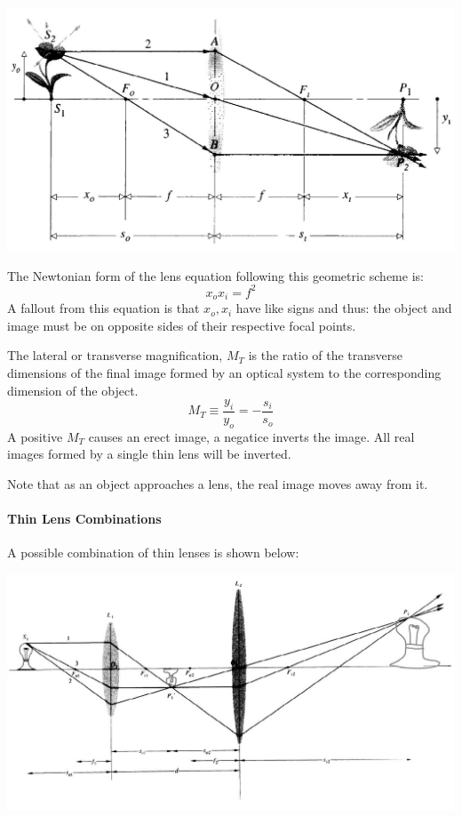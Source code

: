 \documentclass[12pt]{report}
\begin{document}
\includegraphics[scale=.4]{FiniteImagery.jpg}

The Newtonian form of the lens equation following this geometric scheme is: 
\begin{equation}
x_ox_i = f^2
\end{equation}
A fallout from this equation is that $x_o, x_i$ have like signs and thus: the object and image must be on opposite sides of their respective focal points. 

The lateral or transverse magnification, $M_T$ is the ratio of the transverse dimensions of the final image formed by an optical system to the corresponding dimension of the object. 
\begin{equation}
M_T \equiv \frac{y_i}{y_o} = -\frac{s_i}{s_o}
\end{equation}
A positive $M_T$ causes an erect image, a negatice inverts the image. All real images formed by a single thin lens will be inverted. 

Note that as an object approaches a lens, the real image moves away from it. 
\paragraph{Thin Lens Combinations}
A possible combination of thin lenses is shown below:

\includegraphics[scale=.45]{ThinLensCombo.jpg}
\end{document}
